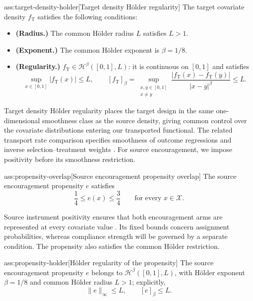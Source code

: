 \documentclass[11pt]{article}
\begin{document}
\begin{assumptionv}{ass:target-density-holder}[Target density Hölder regularity]
The target covariate density \(f_{\mathrm T}\) satisfies the following conditions:
\begin{itemize}
\item \textbf{(Radius.)} The common Hölder radius \(L\) satisfies \(L>1\).
\item \textbf{(Exponent.)} The common Hölder exponent is \(\beta=1/8\).
\item \textbf{(Regularity.)} \(f_{\mathrm T}\in\mathcal H^\beta([0,1],L)\): it is continuous on \([0,1]\) and satisfies
\[
\sup_{x\in[0,1]}|f_{\mathrm T}(x)|\le L,
\qquad
[f_{\mathrm T}]_\beta
=
\sup_{\substack{x,y\in[0,1]\\x\ne y}}
\frac{|f_{\mathrm T}(x)-f_{\mathrm T}(y)|}{|x-y|^\beta}
\le L.
\]
\end{itemize}
\end{assumptionv}

Target density Hölder regularity places the target design in the same one-dimensional smoothness class as the source density, giving common control over the covariate distributions entering our transported functional. The related transport rate comparison specifies smoothness of outcome regressions and inverse selection--treatment weights \citep{ZengKennedyBodnarNaimi2025Efficient}. For source encouragement, we impose positivity before its smoothness restriction.

\begin{assumptionv}{ass:propensity-overlap}[Source encouragement propensity overlap]
The source encouragement propensity \(e\) satisfies
\[
\frac14\le e(x)\le\frac34
\qquad\text{for every }x\in\mathcal X.
\]
\end{assumptionv}

Source instrument positivity ensures that both encouragement arms are represented at every covariate value \citep{ChenHuang2025Generalizing}. Its fixed bounds concern assignment probabilities, whereas compliance strength will be governed by a separate condition. The propensity also satisfies the common Hölder restriction.

\begin{assumptionv}{ass:propensity-holder}[Hölder regularity of the propensity]
The source encouragement propensity \(e\) belongs to \(\mathcal H^\beta([0,1],L)\), with Hölder exponent \(\beta=1/8\) and common Hölder radius \(L>1\); explicitly,
\[
\lVert e\rVert_\infty\le L,
\qquad
[e]_\beta\le L.
\]
\end{assumptionv}
\end{document}
